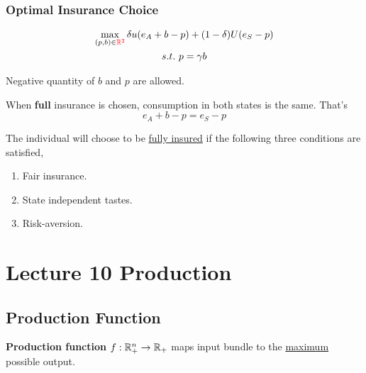 \documentclass[]{article}
\begin{document}
            \subsubsection{Optimal Insurance Choice}
                \begin{gather*}
                    \max_{(p, b) \in \textcolor{red}{\mathbb{R}^2}} \delta u(e_A + b - p) + (1 - \delta) U(e_S - p) \\
                    s.t.\ p = \gamma b
                \end{gather*}
                \begin{remark}
                    Negative quantity of $b$ and $p$ are allowed.
                \end{remark}
                
                \begin{definition}
                    When \textbf{full} insurance is chosen, consumption in both states is the same. That's 
                    \[
                        e_A + b - p = e_S - p
                    \]
                \end{definition}
                
                \begin{theorem}
                    The individual will choose to be \ul{fully insured} if the following three conditions are satisfied,
                    \begin{enumerate}
                        \item Fair insurance.
                        \item State independent tastes.
                        \item Risk-aversion.
                    \end{enumerate}
                \end{theorem}
    
    \section{Lecture 10 Production}
        \subsection{Production Function}
            \begin{definition}
                \textbf{Production function} $f: \mathbb{R}^n_+ \rightarrow \mathbb{R}_+$ maps input bundle to the \ul{maximum} possible output.
            \end{definition}
            
\end{document}
